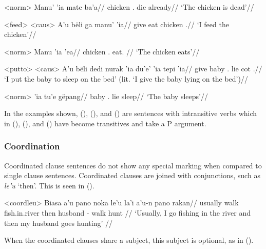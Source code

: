 \documentclass[../hewa_main-subfiles.tex]{subfiles}
\begin{document}
\a<norm> %
\begingl %
\gla Manu' 'ia mate ba'a//
\glb chicken \Def{}.\Sg{} die already//
\glft `The chicken is dead'// 
\endgl
\xe

\pex<feed>
\a<caus> %
\begingl %
\gla A'u bëli ga manu' 'ia//
\glb  \First{}\Sg{} give eat chicken \Def{}.\Sg{}//
\glft `I feed the chicken'// 
\endgl


\a<norm> %
\begingl %
\gla Manu 'ia 'ea//
\glb  chicken \Def{}.\Sg{} eat.\Third{}\Sg{} //
\glft `The chicken eats'// 
\endgl
\xe

\pex<putto>
\a<caus> %
\begingl %
\gla A'u bëli {dedi nurak} 'ia du'e' 'ia tepi 'ia//
\glb \First{}\Sg{} give baby \Def{}.\Sg{} lie \Loc{} cot \Def{}.\Sg{}//
\glft `I put the baby to sleep on the bed' (lit. `I give the baby lying on the bed')// 
\endgl

\a<norm> %
\begingl %
 'ia tu'e gëpang//
\glb baby \Def{}.\Sg{} lie sleep//
\glft `The baby sleeps'// 
\endgl
\xe


In the examples shown, (), (), and () are sentences with intransitive verbs which in  (), (), and () have become transitives and take a P argument.

\subsubsection{Coordination}

Coordinated clause sentences do not show any special marking when compared to single clause sentences. Coordinated clauses are joined with conjunctions, such as \textit{le'u} `then'. This is seen in ().

\ex<coordleu> %
\begingl %
\gla Biasa a'u pano noka le'u la'i a'u-n pano rakan//
\glb usually \First{}\Sg{} walk fish.in.river then husband \First{}\Sg{}-\Poss{} walk hunt //
\glft `Usually, I go fishing in the river and then my husband goes hunting' // 
\endgl
\xe

When the coordinated clauses share a subject, this subject is optional, as in ().
\end{document}
